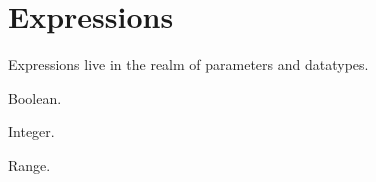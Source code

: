 
\chapter{Expressions}
\label{sec:expressions}

Expressions live in the realm of parameters and datatypes.  

Boolean.

Integer.

Range.  

